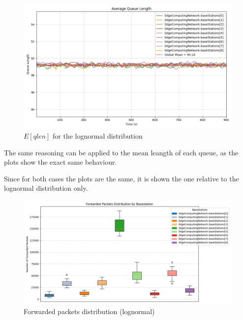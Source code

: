 \documentclass{report}
\begin{document}
\begin{figure}[H]
    \centering
    \includegraphics[width=\textwidth]{img/plots/log_1e4_B/qlen.png}
    \caption{$E[qlen]$ for the lognormal distribution}
\end{figure}


\begin{flushleft}
The same reasoning can be applied to the mean leangth of each queue, as the plots show the exact same behaviour.
\vspace{1em}

Since for both cases the plots are the same, it is shown the one relative to the lognormal distribution only.
\end{flushleft}
\begin{figure}[H]
    \centering
    \includegraphics[width=\textwidth]{img/plots/log_1e4_B/forwarded.png}
    \caption{Forwarded packets distribution (lognormal)}
\end{figure}
\end{document}
